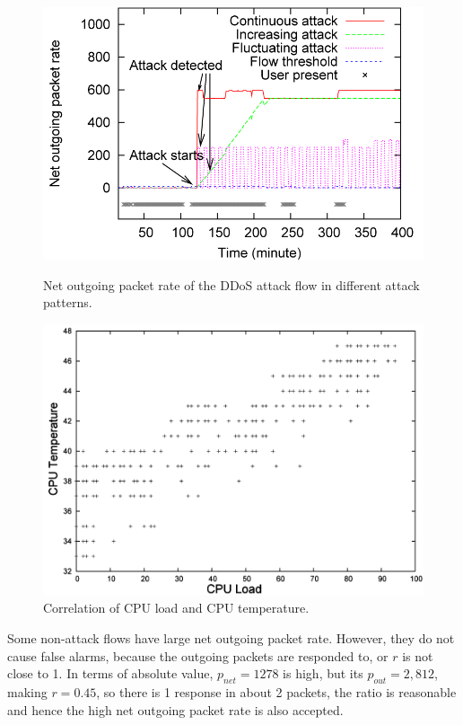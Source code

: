 \begin{figure}[tb]
\begin{center}
\begin{minipage}[t]{.5\textwidth}
\includegraphics[width=1\columnwidth]{sensor/ddos-atkflow.png}
\caption{Net outgoing packet rate of the DDoS attack flow in
different attack patterns.}
\label{fig:ddos-atkflow}
\end{minipage}%
\hfill
\begin{minipage}[t]{.49\textwidth}
\includegraphics[width=1\columnwidth]{sensor/load-temp.png}
\caption{Correlation of CPU load and CPU temperature.}
\label{fig:temp-cpuload}
\end{minipage}
\end{center}
\end{figure}

Some non-attack flows have large net outgoing packet rate. However,
they do not cause false alarms, because the outgoing packets are
responded to, or $r$ is not close to 1. In terms of absolute value,
$p_{net}=1278$ is high, but its $p_{out}=2,812$, making $r=0.45$, so
there is 1 response in about 2 packets, the ratio is reasonable and
hence the high net outgoing packet rate is also accepted.

